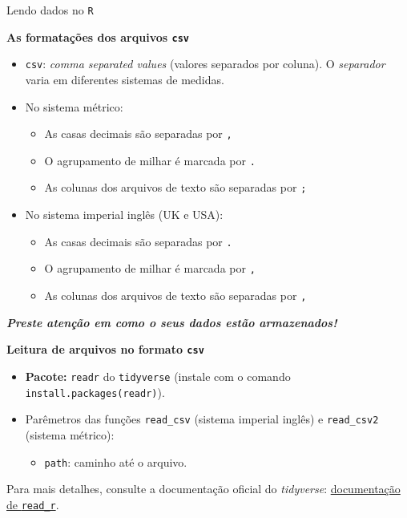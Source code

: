 \documentclass[
  10pt,
  ignorenonframetext,
]{beamer}
\providecommand{\tightlist}{%
  \setlength{\itemsep}{0pt}\setlength{\parskip}{0pt}}
\begin{document}
\begin{frame}[fragile]{Lendo dados no \texttt{R}}
\protect\hypertarget{lendo-dados-no-r-2}{}
\small

\textbf{As formatações dos arquivos \texttt{csv}}

\begin{itemize}
\tightlist
\item
  \texttt{csv}: \emph{comma separated values} (valores separados por
  coluna). O \emph{separador} varia em diferentes sistemas de medidas.
\item
  No sistema métrico:

  \begin{itemize}
  \tightlist
  \item
    As casas decimais são separadas por \texttt{,}
  \item
    O agrupamento de milhar é marcada por \texttt{.}
  \item
    As colunas dos arquivos de texto são separadas por \texttt{;}
  \end{itemize}
\item
  No sistema imperial inglês (UK e USA):

  \begin{itemize}
  \tightlist
  \item
    As casas decimais são separadas por \texttt{.}
  \item
    O agrupamento de milhar é marcada por \texttt{,}
  \item
    As colunas dos arquivos de texto são separadas por \texttt{,}
  \end{itemize}
\end{itemize}

\textbf{\emph{Preste atenção em como o seus dados estão armazenados!}}

\normalsize
\end{frame}

\begin{frame}[fragile]
\textbf{Leitura de arquivos no formato \texttt{csv}}

\begin{itemize}
\tightlist
\item
  \textbf{Pacote:} \texttt{readr} do \texttt{tidyverse} (instale com o
  comando
  \texttt{install.packages(\textquotesingle{}readr\textquotesingle{})}).
\item
  Parêmetros das funções \texttt{read\_csv} (sistema imperial inglês) e
  \texttt{read\_csv2} (sistema métrico):

  \begin{itemize}
  \tightlist
  \item
    \texttt{path}: caminho até o arquivo.
  \end{itemize}
\end{itemize}

Para mais detalhes, consulte a documentação oficial do \emph{tidyverse}:
\href{https://readr.tidyverse.org}{documentação de \texttt{read\_r}}.
\end{frame}
\end{document}
